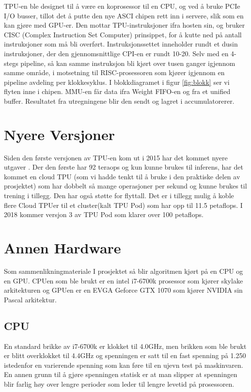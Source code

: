 TPU-en ble designet til å være en koprosessor til en CPU, og ved å bruke PCIe I/O busser, tillot det å putte den nye ASCI chipen rett inn i servere, slik som en kan gjøre med GPU-er. Den mottar TPU-instruksjoner ifra hosten sin, og bruker CISC (Complex Instruction Set Computer) prinsippet, for å kutte ned på antall instruksjoner som må bli overført. Instruksjonssettet inneholder rundt et dusin instruksjoner, der den gjennomsnittlige CPI-en er rundt 10-20. Selv med en 4-stegs pipeline, så kan samme instruksjon bli kjørt over tusen ganger igjennom samme område, i motsetning til RISC-prosessoren som kjører igjennom en pipeline avdeling per klokkesyklus. 
I blokkdiagramet i figur \ref{fig:blokk} ser vi flyten inne i chipen. MMU-en får data ifra Weight FIFO-en og fra et unified buffer. Resultatet fra utregningene blir den sendt og lagret i accumulatorerer.

\newpage
\section{Nyere Versjoner}
Siden den første versjonen av TPU-en kom ut i 2015 har det kommet nyere utgaver \cite{tpu_video}. Der den første har 92 teraops og kun kunne brukes til inferens, har det kommet en cloud TPU (som vi hadde tenkt til å bruke i den praktiske delen av prosjektet) som har dobbelt så mange operasjoner per sekund og kunne brukes til trening i tillegg. Den har også støtte for flyttall. Det er i tillegg mulig å koble flere Cloud TPUer til et cluster(kalt TPU Pod) som har opp til 11.5 petaflops. I 2018 kommer versjon 3 av TPU Pod som klarer over 100 petaflops.


\newpage
\section{Annen Hardware}
Som sammenlikningmateriale I prosjektet så blir algoritmen kjørt på en CPU og en GPU. CPUen som ble brukt er en intel i7-6700k prosessor som kjører skylake arkitekturen og GPUen er en EVGA  Geforce GTX 1070 som kjører NVIDIA sin Pascal arkitektur.

\subsection{CPU}
En standard brikke av i7-6700k er klokket til 4.0GHz, men brikken som ble brukt er blitt overklokket til 4.4GHz og spenningen er satt til en fast spenning på 1.250 istedenfor en varierende spenning som kan føre til en ujevn test på maskinvaren. En annen grunn til å gjøre spenningen statisk er at man slipper at spenningen blir farlig høy over lengre perioder som leder til lengre levetid på prosessoren.

